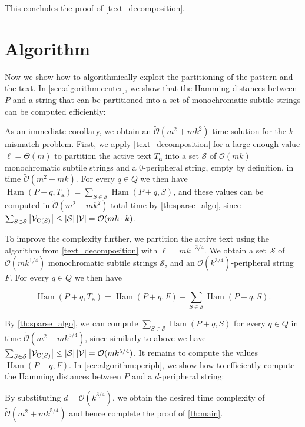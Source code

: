 \documentclass[a4paper,11pt]{article}
\let\Cref\cref
\renewcommand{\O}{\mathcal{O}}
\newcommand{\tO}{\tilde{\mathcal{O}}}
\renewcommand{\S}{\mathcal{S}}
\newcommand{\V}{\mathcal{V}}
\newcommand{\Ta}{T_\mathbf{a}}
\DeclareMathOperator*{\Ham}{Ham}
\newcommand{\absolute}[1]{\left\lvert#1\right\rvert}
\begin{document}
This concludes the proof of \cref{text_decomposition}.

\section{Algorithm}
\label{sec:algorithm}


Now we show how to algorithmically exploit the partitioning of the pattern and the text. In \cref{sec:algorithm:center}, we show that the Hamming distances between $P$ and a string that can be partitioned into a set of monochromatic subtile strings can be computed efficiently:

\restateThmSparseAlgo

As an immediate corollary, we obtain an $\tO(m^2 + mk^2)$-time solution for the $k$-mismatch problem. First, we apply \Cref{text_decomposition} for a large enough value $\ell = \Theta(m)$ to partition the active text $\Ta$ into a set $\S$ of $\O(mk)$ monochromatic subtile strings and a $0$-peripheral string, empty by definition, in time $\tO(m^2 + mk)$. For every $q \in Q$ we then have $\Ham(P + q, \Ta) = \sum_{S \in \S} \Ham(P + q, S)$, and these values can be computed in $\tO(m^2 + mk^{2})$ total time by \cref{th:sparse_algo}, since $\sum_{S \in \S} \absolute{\V_{\getchar{S}}} \le \absolute{\S} \absolute{\V} = \O(mk \cdot k)$. 

To improve the complexity further, we partition the active text using the algorithm from \Cref{text_decomposition} with $\ell = mk^{-3/4}$.
We obtain a set~$\S$ of $\O(mk^{1/4})$ monochromatic subtile strings $\S$, and an $\O(k^{3 / 4})$-peripheral string $F$. For every $q \in Q$ we then have

\[ \Ham(P + q, \Ta) = \Ham(P + q, F) + \sum_{S \in \S} \Ham(P + q, S).\]

By \cref{th:sparse_algo}, we can compute $\sum_{S \in \S} \Ham(P + q, S)$ for every $q \in Q$ in time $\tO(m^2 + mk^{5/4})$, since similarly to above we have $\sum_{S \in \S} \absolute{\V_{\getchar{S}}} \le \absolute{\S} \absolute{\V} = \O(mk^{5/4})$. It remains to compute the values $\Ham(P + q, F)$. In \cref{sec:algorithm:periph}, we show how to efficiently compute the Hamming distances between $P$ and a $d$-peripheral string:

\restateThmDenseAlgo

By substituting $d = \O(k^{3/4})$, we obtain the desired time complexity of $\tO(m^2 + mk^{5/4})$ and hence complete the proof of \cref{th:main}.
\end{document}
